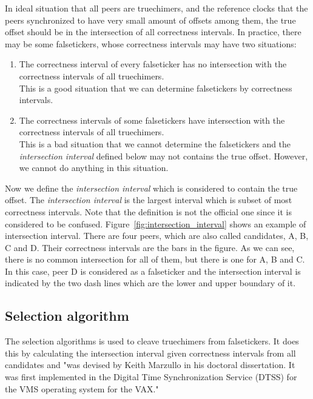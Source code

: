 In ideal situation that all peers are truechimers, and the reference clocks
that the peers synchronized to have very small amount of offsets among them,
the true offset should be in the intersection of all correctness intervals. In
practice, there may be some falsetickers, whose correctness intervals may have
two situations:
\begin{enumerate}
    \item The correctness interval of every falseticker has no intersection
        with the correctness intervals of all truechimers.\\ This is a good
        situation that we can determine falsetickers by correctness intervals.
    \item The correctness intervals of some falsetickers have intersection with
        the correctness intervals of all truechimers.\\ This is a bad situation
        that we cannot determine the falsetickers and the \emph{intersection
        interval} defined below may not contains the true offset. However, we
        cannot do anything in this situation.
\end{enumerate}

Now we define the \emph{intersection interval} which is considered to contain
the true offset. The \emph{intersection interval} is the largest interval
which is subset of most correctness intervals. Note that the definition is
not the official one since it is considered to be confused.
Figure~\ref{fig:intersection_interval} shows an example of intersection
interval. There are four peers, which are also called candidates, A, B, C and
D\null. Their correctness intervals are the bars in the figure. As we can see,
there is no common intersection for all of them, but there is one for A, B
and C\null. In this case, peer D is considered as a falseticker and the
intersection interval is indicated by the two dash lines which are the lower
and upper boundary of it.



\subsection{Selection algorithm}%
\label{sub:selection_algorithm}
The selection algorithms is used to cleave truechimers from falsetickers. It
does this by calculating the intersection interval given correctness intervals
from all candidates and "was devised by Keith Marzullo in his doctoral
dissertation.  It was first implemented in the Digital Time Synchronization
Service (DTSS) for the VMS operating system for the
VAX\null."~\cite{clock_selection}

